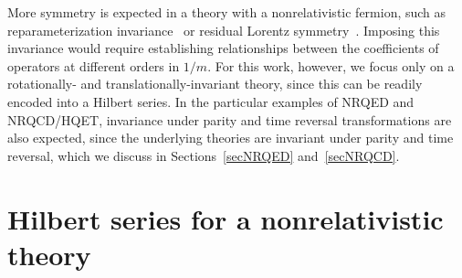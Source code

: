 \documentclass[prd,onecolumn, nofootinbib, 11pt]{revtex4}
\begin{document}
More symmetry is expected in a theory with a nonrelativistic fermion, such as reparameterization invariance~\cite{Luke:1992cs, Manohar:1997qy} or residual Lorentz symmetry~\cite{Heinonen:2012km}. 
Imposing this invariance would require establishing relationships between the coefficients of operators at different orders in $1/m$.  For this work, however, we focus only on a rotationally- and translationally-invariant theory, since this can be readily encoded into a Hilbert series.  In the particular examples of NRQED and NRQCD/HQET, invariance under parity and time reversal transformations are also expected, since the underlying theories are invariant under parity and time reversal, which we discuss in Sections~\ref{secNRQED} and~\ref{secNRQCD}.  



\section{Hilbert series for a nonrelativistic theory}
\label{secHS}
\end{document}
